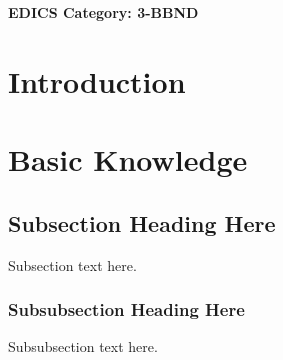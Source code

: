 \documentclass[journal]{IEEEtran}
\let\MYoriglatexcaption\caption
\renewcommand{\caption}[2][\relax]{\MYoriglatexcaption[#2]{#2}}
\begin{document}
\ifCLASSOPTIONpeerreview
 \begin{center} \bfseries EDICS Category: 3-BBND \end{center}
 \fi
\IEEEpeerreviewmaketitle



\section{Introduction}
\label{sec:intro}

\section{Basic Knowledge}

\subsection{Subsection Heading Here}
Subsection text here.


\subsubsection{Subsubsection Heading Here}
Subsubsection text here.






%


\end{document}
